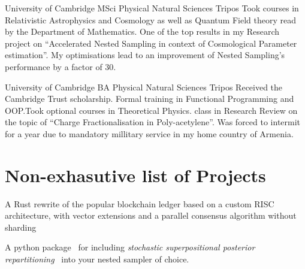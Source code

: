 \documentclass{CurriculumVitae}[10pt, draft, condensed]
\begin{document}
{   {University of Cambridge} {MSci }
  {Physical Natural Sciences Tripos} {Took courses in Relativistic
    Astrophysics and Cosmology as well as Quantum Field theory read by
    the Department of Mathematics. One of the top results in my
    Research project on ``Accelerated Nested Sampling in context of
    Cosmological Parameter estimation''. My optimisations lead to an
    improvement of Nested Sampling's performance by a factor of 30. }

  {University of Cambridge} {BA }{Physical Natural Sciences
    Tripos} {Received the Cambridge Trust scholarship. Formal training
    in Functional Programming and OOP.\@ Took optional courses in
    Theoretical Physics.  class in Research Review on the topic
    of ``Charge Fractionalisation in Poly-acetylene''. Was forced to
    intermit for a year due to mandatory millitary service in my home
    country of Armenia. }

  \section*{Non-exhasutive list of Projects}%
  {A Rust rewrite of the popular blockchain ledger based on a custom
    RISC architecture, with vector extensions and a parallel consensus
    algorithm without sharding}

    

  

   {A
    python package~\cite{sspr-maxent} for including \emph{stochastic
      superpositional posterior repartitioning}~\cite{sspr} into your
    nested sampler of choice.}

}
\end{document}
